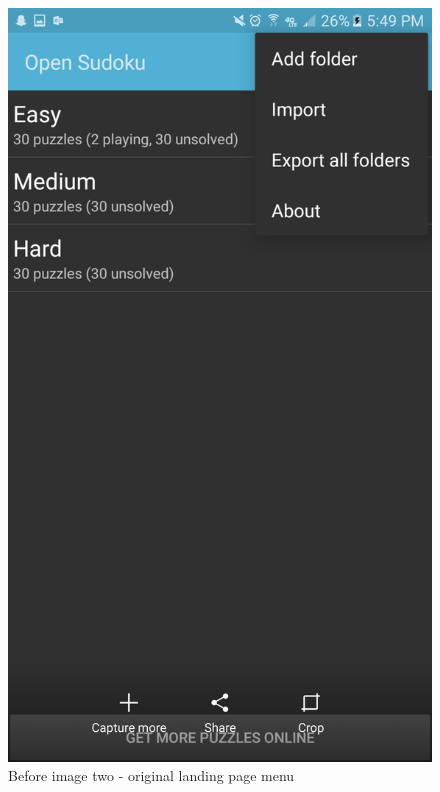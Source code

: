 \documentclass[10pt]{article}
\begin{document}
\begin{figure}
\includegraphics[width=\linewidth]{img/before2.png}
\caption{Before image two - original landing page menu}
\end{figure}
\end{document}

